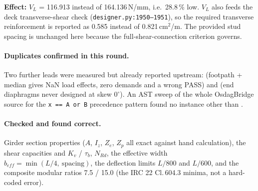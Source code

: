 \textbf{Effect:} $V_L$ = 116.913 instead of 164.136\,N/mm, i.e.\ 28.8\,\% low. $V_L$ also feeds the deck transverse-shear check (\texttt{designer.py:1950--1951}), so the required transverse reinforcement is reported as 0.585 instead of 0.821\,cm$^2$/m. The provided stud spacing is unchanged here because the full-shear-connection criterion governs.

\paragraph{Duplicates confirmed in this round.} Two further leads were measured but already reported upstream:  (footpath + median gives NaN load effects, zero demands and a wrong PASS) and  (end diaphragms never designed at skew $0^\circ$). An AST sweep of the whole OsdagBridge source for the \texttt{x == A or B} precedence pattern found no instance other than .

\paragraph{Checked and found correct.} Girder section properties ($A$, $I_z$, $Z_e$, $Z_p$ all exact against hand calculation), the shear capacities and $K_v$ / $\tau_b$, $N_{Rd}$, the effective width $b_{eff} = \min(L/4,\ \mathrm{spacing})$, the deflection limits $L/800$ and $L/600$, and the composite modular ratios 7.5 / 15.0 (the IRC 22 Cl.\,604.3 minima, not a hard-coded error).
